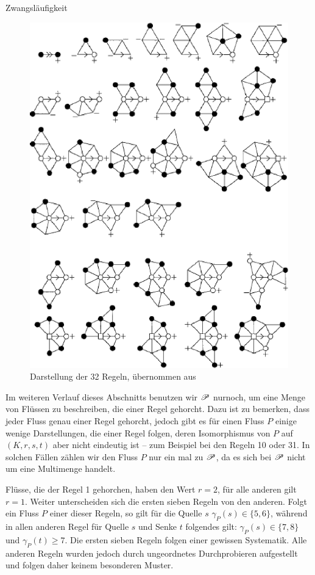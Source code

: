 \begin{section}{Zwangsläufigkeit}
 \begin{figure}[ht]
  \label{fig4}
  \centering
  \includegraphics{seymour/regeln.eps}%
  \caption[Darstellung der 32 Regeln]{Darstellung der 32 Regeln, übernommen aus \cite{FourRSST}}
 \end{figure}

 Im weiteren Verlauf dieses Abschnitts benutzen wir $\mathscr{P}$ nurnoch, um eine Menge von Flüssen zu beschreiben, die einer Regel gehorcht. Dazu ist zu bemerken, dass jeder Fluss genau einer Regel gehorcht, jedoch gibt es für einen Fluss $P$ einige wenige Darstellungen, die einer Regel folgen, deren Isomorphismus von $P$ auf $(K,r,s,t)$ aber nicht eindeutig ist -- zum Beispiel bei den Regeln 10 oder 31. In solchen Fällen zählen wir den Fluss $P$ nur ein mal zu $\mathscr{P}$, da es sich bei $\mathscr{P}$ nicht um eine Multimenge handelt.
 
 Flüsse, die der Regel 1 gehorchen, haben den Wert $r=2$, für alle anderen gilt $r=1$. Weiter unterscheiden sich die ersten sieben Regeln von den anderen. Folgt ein Fluss $P$ einer dieser Regeln, so gilt für die Quelle $s$ $\gamma_P(s) \in \{5,6\}$, während in allen anderen Regel für Quelle $s$ und Senke $t$ folgendes gilt: $\gamma_P(s) \in \{7,8\}$ und $\gamma_P(t) \geq 7$. Die ersten sieben Regeln folgen einer gewissen Systematik. Alle anderen Regeln wurden jedoch durch ungeordnetes Durchprobieren aufgestellt und folgen daher keinem besonderen Muster.
 

\end{section}
